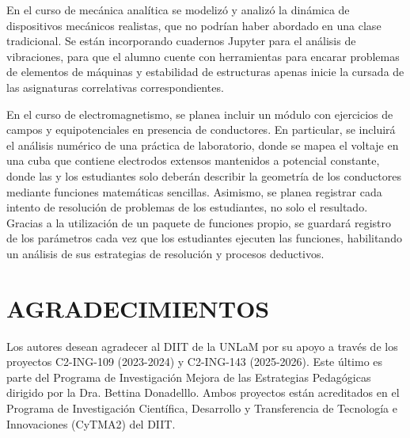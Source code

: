 \documentclass[a4paper]{fodami}        %
\begin{document}
En el curso de mecánica analítica se modelizó y analizó la dinámica de dispositivos mecánicos realistas, que no podrían haber abordado en una clase tradicional.
Se están incorporando cuadernos Jupyter para el análisis de vibraciones, para que el alumno cuente con herramientas para encarar problemas de elementos de máquinas y estabilidad de estructuras apenas inicie la cursada de las asignaturas correlativas correspondientes.

En el curso de electromagnetismo, se planea incluir un módulo con ejercicios de campos y equipotenciales en presencia de conductores.
En particular, se incluirá el análisis numérico de una práctica de laboratorio, donde se mapea el voltaje en una cuba que contiene electrodos extensos mantenidos a potencial constante, donde las y los estudiantes solo deberán describir la geometría de los conductores mediante funciones matemáticas sencillas.
Asimismo, se planea registrar cada intento de resolución de problemas de los estudiantes, no solo el resultado.
Gracias a la utilización de un paquete de funciones propio, se guardará registro de los parámetros cada vez que los estudiantes ejecuten las funciones, habilitando un análisis de sus estrategias de resolución y procesos deductivos.

\section{AGRADECIMIENTOS}

Los autores desean agradecer al DIIT de la UNLaM por su apoyo a través de los proyectos C2-ING-109 (2023-2024) y C2-ING-143 (2025-2026).
Este último es parte del Programa de Investigación Mejora de las Estrategias Pedagógicas dirigido por la Dra. Bettina Donadelllo.
Ambos proyectos están acreditados en el Programa de Investigación Científica, Desarrollo y Transferencia de Tecnología e Innovaciones (CyTMA2) del DIIT.


\end{document}
